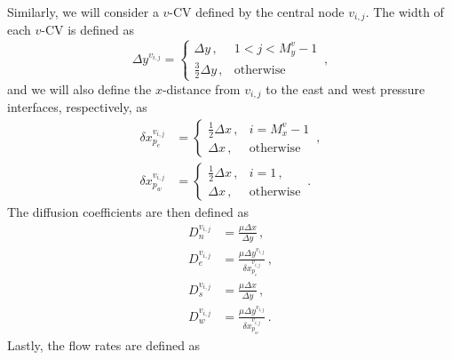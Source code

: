 \documentclass{article}
\begin{document}
Similarly, we will consider a $v$-CV defined by the central node $v_{i,j}$. The width of each $v$-CV is defined as
\begin{equation}
\Delta y^{v_{i,j}} = \begin{cases}
\Delta y \,, & 1 < j < M_y^v - 1 \\
\frac{3}{2} \Delta y \,, & \text{otherwise}
\end{cases}\,,
\end{equation}
and we will also define the $x$-distance from $v_{i,j}$ to the east and west pressure interfaces, respectively, as
\begin{subequations}
	\begin{align}
	\delta x^{v_{i,j}}_{p_e} & = \begin{cases}
	\frac{1}{2} \Delta x\,, & i = M_x^v - 1 \\
	\Delta x \,, & \text{otherwise}
	\end{cases}\,, \\
	\delta x^{v_{i,j}}_{p_w} & = \begin{cases}
	\frac{1}{2} \Delta x\,, & i = 1\,, \\
	\Delta x\,, & \text{otherwise}
	\end{cases}\,.
	\end{align}
\end{subequations}
The diffusion coefficients are then defined as
\begin{subequations}
	\begin{align}
	D_n^{v_{i,j}} & = \frac{\mu \Delta x}{\Delta y}\,,\\
	D_e^{v_{i,j}} & = \frac{\mu \Delta y^{v_{i,j}}}{\delta x^{v_{i,j}}_{p_e}}\,,\\
	D_s^{v_{i,j}} & = \frac{\mu \Delta x}{\Delta y}\,,\\
	D_w^{v_{i,j}} & = \frac{\mu\Delta y^{v_{i,j}}}{\delta x^{v_{i,j}}_{p_w}}\,.
	\end{align}
\end{subequations}
Lastly, the flow rates are defined as
\end{document}

